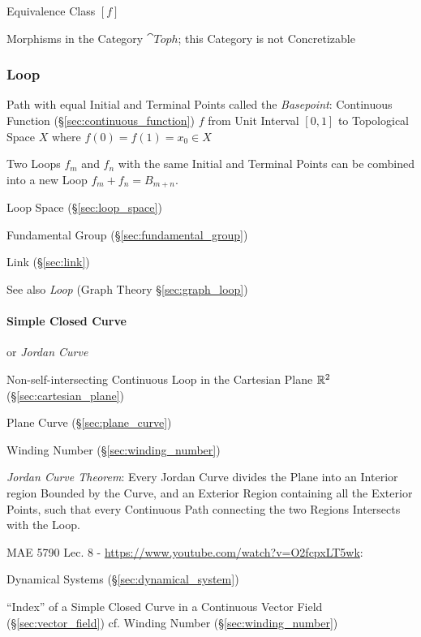 Equivalence Class $[f]$

Morphisms in the Category $\cat{Toph}$; this Category is not
Concretizable



\subsubsection{Loop}\label{sec:loop}

Path with equal Initial and Terminal Points called the
\emph{Basepoint}: Continuous Function
(\S\ref{sec:continuous_function}) $f$ from Unit Interval $[0,1]$ to
Topological Space $X$ where $f(0) = f(1) = x_0 \in X$

Two Loops $f_m$ and $f_n$ with the same Initial and Terminal Points
can be combined into a new Loop $f_m + f_n = B_{m+n}$.
\cite{hatcher02}

Loop Space (\S\ref{sec:loop_space})

Fundamental Group (\S\ref{sec:fundamental_group})

Link (\S\ref{sec:link})

\fist See also \emph{Loop} (Graph Theory \S\ref{sec:graph_loop})



\paragraph{Simple Closed Curve}\label{sec:simple_closed_curve}\hfill

or \emph{Jordan Curve}

Non-self-intersecting Continuous Loop in the Cartesian Plane $\mathbb{R}^2$
(\S\ref{sec:cartesian_plane})

\fist Plane Curve (\S\ref{sec:plane_curve})

Winding Number (\S\ref{sec:winding_number})

\emph{Jordan Curve Theorem}: Every Jordan Curve divides the Plane into an
Interior region Bounded by the Curve, and an Exterior Region containing all the
Exterior Points, such that every Continuous Path connecting the two Regions
Intersects with the Loop.


MAE 5790 Lec. 8 - \url{https://www.youtube.com/watch?v=O2fcpxLT5wk}:

\fist Dynamical Systems (\S\ref{sec:dynamical_system})

``Index'' of a Simple Closed Curve in a Continuous Vector Field
(\S\ref{sec:vector_field}) \fist cf. Winding Number
(\S\ref{sec:winding_number})




